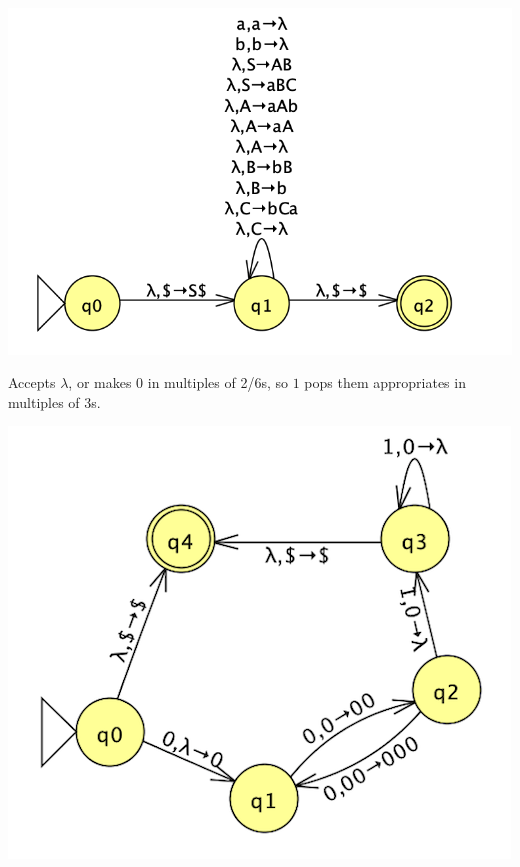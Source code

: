 \documentclass{homework}
\begin{document}
\begin{center}
\includegraphics{a8_3.png}\\
\end{center}
\question
Accepts $\lambda$, or makes $0$ in multiples of 2/6s, so $1$ pops them appropriates in multiples of 3s.
\begin{center}
\includegraphics{a8_4.png}\\
\end{center}
\end{document}
